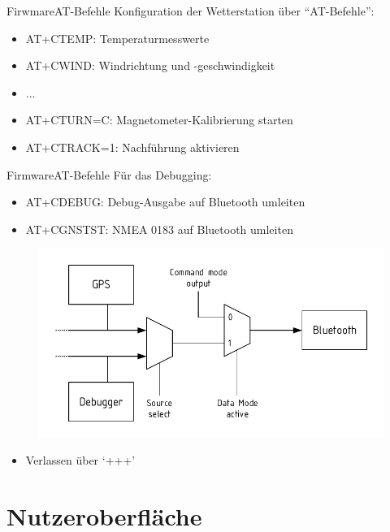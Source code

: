 \documentclass{beamer}
\begin{document}
\begin{frame}{Firwmare}{AT-Befehle}
    Konfiguration der Wetterstation über ``AT-Befehle'':
    \begin{itemize}
        \item AT+CTEMP: Temperaturmesswerte
        \item AT+CWIND: Windrichtung und -geschwindigkeit
        \item ...
        \item AT+CTURN=C: Magnetometer-Kalibrierung starten
        \item AT+CTRACK=1: Nachführung aktivieren
    \end{itemize}
\end{frame}

\begin{frame}{Firmware}{AT-Befehle}
    Für das Debugging:
    \begin{itemize}
        \item AT+CDEBUG: Debug-Ausgabe auf Bluetooth umleiten
        \item AT+CGNSTST: NMEA 0183 auf Bluetooth umleiten
    \end{itemize}
    \begin{figure}[H]
        \centering
        \includegraphics[width=.8\textwidth]{./img/Datenpfad_BT.pdf}
    \end{figure}
    \begin{itemize}
        \item Verlassen über `+++' 
    \end{itemize}
\end{frame}

\section{Nutzeroberfläche}
\end{document}
